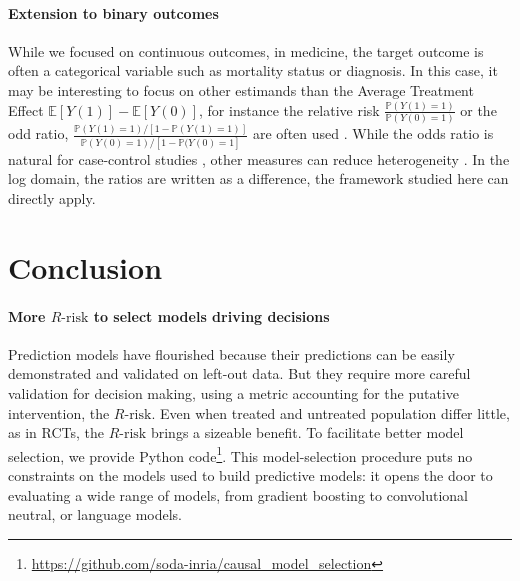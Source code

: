 \documentclass[10pt,twocolumn]{article}
\begin{document}
\paragraph{Extension to binary outcomes}
While we focused on continuous outcomes, in medicine, the target outcome
is often a categorical variable such as mortality status or diagnosis. In
this case, it may be interesting to focus on other estimands than the
Average Treatment Effect $\mathbb{E}[Y(1)] -\mathbb{E}[Y(0)] $, for instance the relative risk
$\frac{\mathbb P(Y(1) = 1)}{\mathbb P(Y(0) = 1)}$
or the odd ratio, $\frac{\mathbb P(Y(1) = 1) / [1 - \mathbb P(Y(1)
    =1)]}{\mathbb P(Y(0) = 1) / [1 - \mathbb P(Y(0) = 1]}$ are often used
\cite{austin2017estimating}. While the odds ratio is natural for
case-control studies \cite{rothman2008case}, other measures
can reduce heterogeneity \cite{colnet2023risk}.
In the log domain, the ratios are written as a difference, the
framework studied here can directly apply.

\section{Conclusion}\label{sec:conclusion}
\paragraph{More $R\text{-risk}$ to select models driving decisions}

Prediction models have flourished because their predictions can be easily
demonstrated and validated on left-out data. But they require more
careful validation for decision making, using a metric accounting for the
putative intervention, the $R\text{-risk}$. Even when treated and
untreated population differ little, as in RCTs, the $R\text{-risk}$
brings a sizeable benefit. To facilitate better model selection, we provide Python
code\footnote{\url{https://github.com/soda-inria/causal_model_selection}}.
This model-selection procedure puts no constraints on the models used to
build predictive models: it opens the door to evaluating a wide range of
models, from gradient boosting to convolutional neutral, or language
models.
\end{document}
